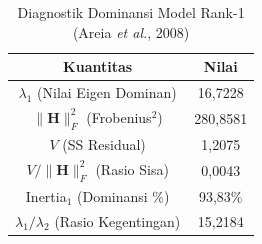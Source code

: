\begin{table}[H]
\centering
\small
\caption{Diagnostik Dominansi Model Rank-1 (Areia \textit{et al.}, 2008)} \label{tab:sample2struktur_diagnostik}
\begin{tabular}{|c|c|}
\hline
\textbf{Kuantitas} & \textbf{Nilai} \\
\hline
$\lambda_1$ (Nilai Eigen Dominan) & 16,7228 \\
$\|\mathbf{H}\|_F^2$ (Frobenius$^2$) & 280,8581 \\
$V$ (SS Residual) & 1,2075 \\
$V / \|\mathbf{H}\|_F^2$ (Rasio Sisa) & 0,0043 \\
Inertia$_1$ (Dominansi \%) & 93,83\% \\
$\lambda_1 / \lambda_2$ (Rasio Kegentingan) & 15,2184 \\
\hline
\end{tabular}
\end{table}